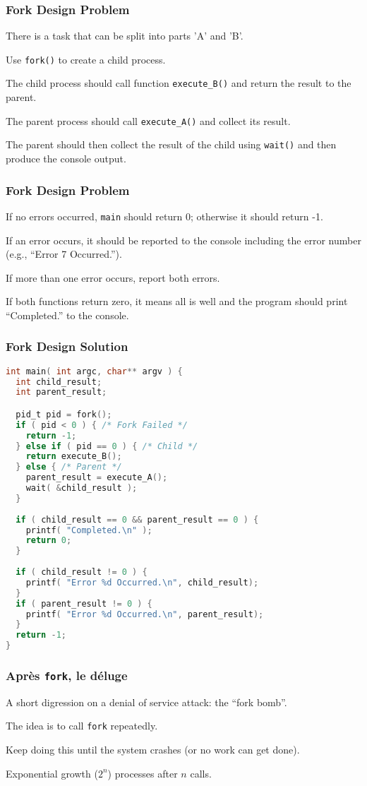\begin{frame}
	\frametitle{Fork Design Problem}

	There is a task that can be split into parts 'A' and 'B'.

	Use \texttt{fork()} to create a child process.

	The child process should call function \texttt{execute\_B()} and return the result to the parent.

	The parent process should call \texttt{execute\_A()} and collect its result.

	The parent should then collect the result of the child using \texttt{wait()} and then produce the console output.

\end{frame}

\begin{frame}
	\frametitle{Fork Design Problem}
	If no errors occurred, \texttt{main} should return 0; otherwise it should return -1.

	If an error occurs, it should be reported to the console including the error number (e.g., ``Error 7 Occurred.'').

	If more than one error occurs, report both errors.

	If both functions return zero, it means all is well and the program should print ``Completed.'' to the console.

\end{frame}


\begin{frame}[fragile]
	\frametitle{Fork Design Solution}
	\begin{lstlisting}[language=C]
int main( int argc, char** argv ) {
  int child_result;
  int parent_result;

  pid_t pid = fork();
  if ( pid < 0 ) { /* Fork Failed */
    return -1;
  } else if ( pid == 0 ) { /* Child */
    return execute_B();
  } else { /* Parent */ 
    parent_result = execute_A();
    wait( &child_result );
  }
  
  if ( child_result == 0 && parent_result == 0 ) {
    printf( "Completed.\n" );
    return 0;
  }
  
  if ( child_result != 0 ) {
    printf( "Error %d Occurred.\n", child_result);
  }
  if ( parent_result != 0 ) {
    printf( "Error %d Occurred.\n", parent_result);
  }
  return -1;
}
\end{lstlisting}
\end{frame}

\begin{frame}
	\frametitle{Apr\`{e}s \texttt{fork}, le d\'{e}luge}

	A short digression on a denial of service attack: the ``fork bomb''.

	The idea is to call \texttt{fork} repeatedly.

	Keep doing this until the system crashes (or no work can get done).

	Exponential growth ($2^n$) processes after $n$ calls.

\end{frame}


